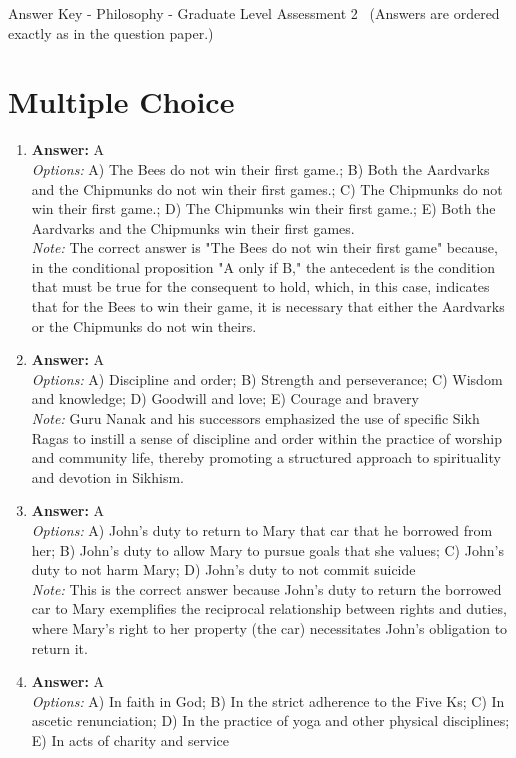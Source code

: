 \documentclass[12pt]{article}
\begin{document}
\begin{center}
Answer Key - Philosophy - Graduate Level Assessment 2 \
\small (Answers are ordered exactly as in the question paper.)
\end{center}

\section*{Multiple Choice}
\begin{enumerate}[label=\arabic*.]
\item \textbf{Answer:} A
\\ \textit{Options:} A) The Bees do not win their first game.; B) Both the Aardvarks and the Chipmunks do not win their first games.; C) The Chipmunks do not win their first game.; D) The Chipmunks win their first game.; E) Both the Aardvarks and the Chipmunks win their first games.
\\ \textit{Note:} The correct answer is "The Bees do not win their first game" because, in the conditional proposition "A only if B," the antecedent is the condition that must be true for the consequent to hold, which, in this case, indicates that for the Bees to win their game, it is necessary that either the Aardvarks or the Chipmunks do not win theirs.
\item \textbf{Answer:} A
\\ \textit{Options:} A) Discipline and order; B) Strength and perseverance; C) Wisdom and knowledge; D) Goodwill and love; E) Courage and bravery
\\ \textit{Note:} Guru Nanak and his successors emphasized the use of specific Sikh Ragas to instill a sense of discipline and order within the practice of worship and community life, thereby promoting a structured approach to spirituality and devotion in Sikhism.
\item \textbf{Answer:} A
\\ \textit{Options:} A) John's duty to return to Mary that car that he borrowed from her; B) John's duty to allow Mary to pursue goals that she values; C) John's duty to not harm Mary; D) John's duty to not commit suicide
\\ \textit{Note:} This is the correct answer because John's duty to return the borrowed car to Mary exemplifies the reciprocal relationship between rights and duties, where Mary's right to her property (the car) necessitates John's obligation to return it.
\item \textbf{Answer:} A
\\ \textit{Options:} A) In faith in God; B) In the strict adherence to the Five Ks; C) In ascetic renunciation; D) In the practice of yoga and other physical disciplines; E) In acts of charity and service

\end{enumerate}
\end{document}
